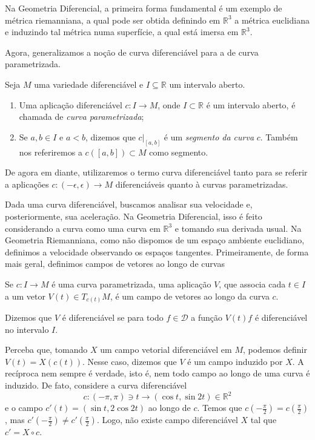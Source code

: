 \begin{example}
	\label{ex:geometria-diferencial}
	Na Geometria Diferencial, a primeira forma fundamental é um exemplo de métrica riemanniana, a qual pode ser obtida definindo em $\mathbb{R}^{3}$ a métrica euclidiana e induzindo tal métrica numa superfície, a qual está imersa em $\mathbb{R}^{3}$.
\end{example}
Agora, generalizamos a noção de curva diferenciável para a de curva parametrizada.
\begin{definition}
	\label{def:curva-parametrizada}
	Seja $M$ uma variedade diferenciável e $I \subseteq \mathbb{R}$ um intervalo aberto.
	\begin{enumerate}[label=(\roman*)]
		\item Uma aplicação diferenciável $c:I\to M$, onde $I \subset \mathbb{R}$ é um intervalo aberto, é chamada de \emph{curva parametrizada};
		\item Se $a,b \in I$ e $a <b$, dizemos que $c|_{[a,b]}$ é um \emph{segmento da curva} $c$. Também nos referiremos a $c([a,b])\subset M$ como segmento.
	\end{enumerate}
\end{definition}
De agora em diante, utilizaremos o termo curva diferenciável tanto para se referir a aplicações $c:(-\epsilon, \epsilon)\to M$ diferenciáveis quanto à curvas parametrizadas.

Dada uma curva diferenciável, buscamos analisar sua velocidade e, posteriormente, sua aceleração. Na Geometria Diferencial, isso é feito considerando a curva como uma curva em $\mathbb{R}^{3}$ e tomando sua derivada usual. Na Geometria Riemanniana, como não dispomos de um espaço ambiente euclidiano, definimos a velocidade observando os espaços tangentes. Primeiramente, de forma mais geral, definimos campos de vetores ao longo de curvas
\begin{definition}
	\label{def:campo-ao-longo-de-curva}
	Se $c:I\to M$ é uma curva parametrizada, uma aplicação $V$, que associa cada $t \in I$ a um vetor $V(t) \in T_{c(t)}M$, é um campo de vetores ao longo da curva $c$.

	Dizemos que $V$ é diferenciável se para todo $f \in \mathcal{D}$ a função $V(t)f$ é diferenciável no intervalo $I$.
\end{definition}
Perceba que, tomando $X$ um campo vetorial diferenciável em $M$, podemos definir $V(t)=X(c(t))$. Nesse caso, dizemos que $V$ é um campo induzido por $X$. A recíproca nem sempre é verdade, isto é, nem todo campo ao longo de uma curva é induzido. De fato, considere a curva diferenciável
\begin{equation*}
	c:(-\pi,\pi) \ni t \to (\cos t,\sin2t)\in \mathbb{R}^{2}
\end{equation*}
e o campo $c'(t)=(\sin t, 2\cos2t)$ ao longo de $c$.
Temos que $c\left( -\frac{\pi}{2} \right)=c\left( \frac{\pi}{2} \right)$, mas $c'\left(-\frac{\pi}{2} \right)\neq c'\left( \frac{\pi}{2} \right)$. Logo, não existe campo diferenciável $X$ tal que $c'=X\circ c$.

